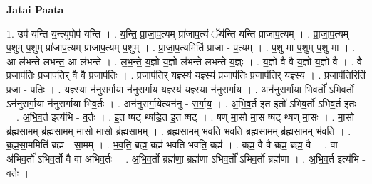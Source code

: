 \documentclass[17pt]{extarticle}
\begin{document}
\textbf{Jatai Paata} \newline

1. उप॑ यन्ति य॒न्त्युपोप॑ यन्ति । . य॒न्ति॒ प्रा॒जा॒प॒त्यम् प्रा॑जाप॒त्यं ॅय॑न्ति यन्ति प्राजाप॒त्यम् । . प्रा॒जा॒प॒त्यम् प॒शुम् प॒शुम् प्रा॑जाप॒त्यम् प्रा॑जाप॒त्यम् प॒शुम् । . प्रा॒जा॒प॒त्यमिति॑ प्राजा - प॒त्यम् । . प॒शु मा प॒शुम् प॒शु मा । . आ ल॑भन्ते लभन्त॒ आ ल॑भन्ते । . ल॒भ॒न्ते॒ य॒ज्ञो य॒ज्ञो ल॑भन्ते लभन्ते य॒ज्ञ्ः । . य॒ज्ञो वै वै य॒ज्ञो य॒ज्ञो वै । . वै प्र॒जाप॑तिः प्र॒जाप॑ति॒र् वै वै प्र॒जाप॑तिः । . प्र॒जाप॑तिर् य॒ज्ञ्स्य॑ य॒ज्ञ्स्य॑ प्र॒जाप॑तिः प्र॒जाप॑तिर् य॒ज्ञ्स्य॑ । . प्र॒जाप॑ति॒रिति॑ प्र॒जा - प॒तिः॒ । . य॒ज्ञ्स्या न॑नुसर्गा॒या न॑नुसर्गाय य॒ज्ञ्स्य॑ य॒ज्ञ्स्या न॑नुसर्गाय । . अन॑नुसर्गाया भिव॒र्तो॑ ऽभिव॒र्तो ऽन॑नुसर्गा॒या न॑नुसर्गाया भिव॒र्तः । . अन॑नुसर्गा॒येत्यन॑नु - स॒र्गा॒य॒ । . अ॒भि॒व॒र्त इ॒त इ॒तो॑ ऽभिव॒र्तो॑ ऽभिव॒र्त इ॒तः । . अ॒भि॒व॒र्त इत्य॑भि - व॒र्तः । . इ॒त ष्षट् थ्षडि॒त इ॒त ष्षट् । . षण् मा॒सो मा॒स ष्षट् थ्षण् मा॒सः । . मा॒सो ब्र॑ह्मसा॒मम् ब्र॑ह्मसा॒मम् मा॒सो मा॒सो ब्र॑ह्मसा॒मम् । . ब्र॒ह्म॒सा॒मम् भ॑वति भवति ब्रह्मसा॒मम् ब्र॑ह्मसा॒मम् भ॑वति । . ब्र॒ह्म॒सा॒ममिति॑ ब्रह्म - सा॒मम् । . भ॒व॒ति॒ ब्रह्म॒ ब्रह्म॑ भवति भवति॒ ब्रह्म॑ । . ब्रह्म॒ वै वै ब्रह्म॒ ब्रह्म॒ वै । . वा अ॑भिव॒र्तो॑ ऽभिव॒र्तो वै वा अ॑भिव॒र्तः । . अ॒भि॒व॒र्तो ब्रह्म॑णा॒ ब्रह्म॑णा ऽभिव॒र्तो॑ ऽभिव॒र्तो ब्रह्म॑णा । . अ॒भि॒व॒र्त इत्य॑भि - व॒र्तः । \newline
\end{document}

